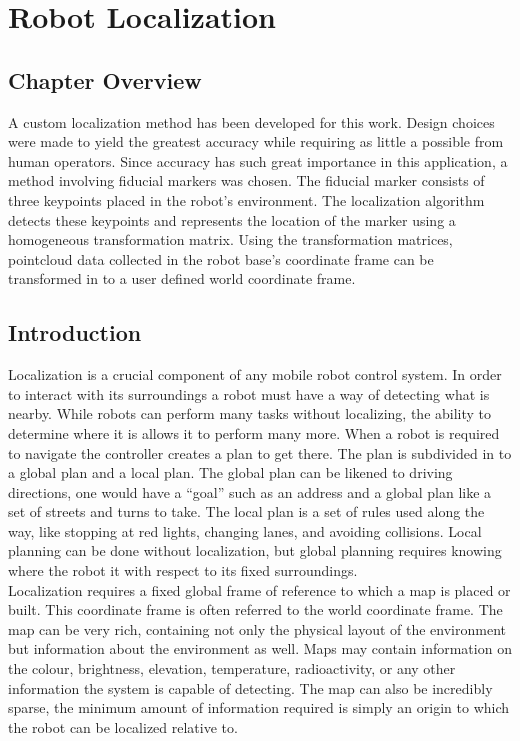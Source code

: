 \chapter{Robot Localization}
\label{chap:localiz}
\section{Chapter Overview}
A custom localization method has been developed for this work. Design choices were made to yield the greatest accuracy while requiring as little a possible from human operators. Since accuracy has such great importance in this application, a method involving fiducial markers was chosen. The fiducial marker consists of three keypoints placed in the robot's environment. The localization algorithm detects these keypoints and represents the location of the marker using a homogeneous transformation matrix. Using the transformation matrices, pointcloud data collected in the robot base's coordinate frame can be transformed in to a user defined world coordinate frame.\\

\section{Introduction}
Localization is a crucial component of any mobile robot control system. In order to interact with its surroundings a robot must have a way of detecting what is nearby. While robots can perform many tasks without localizing, the ability to determine where it is allows it to perform many more. When a robot is required to navigate the controller creates a plan to get there. The plan is subdivided in to a global plan and a local plan. The global plan can be likened to driving directions, one would have a ``goal'' such as an address and a global plan like a set of streets and turns to take. The local plan is a set of rules used along the way, like stopping at red lights, changing lanes, and avoiding collisions. Local planning can be done without localization, but global planning requires knowing where the robot it with respect to its fixed surroundings.\\

Localization requires a fixed global frame of reference to which a map is placed or built. This coordinate frame is often referred to the world coordinate frame. The map can be very rich, containing not only the physical layout of the environment but information about the environment as well. Maps may contain information on the colour, brightness, elevation, temperature, radioactivity, or any other information the system is capable of detecting. The map can also be incredibly sparse, the minimum amount of information required is simply an origin to which the robot can be localized relative to.\\

